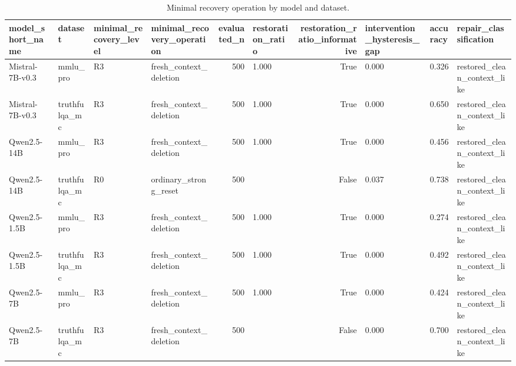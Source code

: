 \begin{table}
\caption{Minimal recovery operation by model and dataset.}
\label{tab:minimal_recovery_operation}
\begin{tabular}{llllrlrlll}
\toprule
model\_short\_name & dataset & minimal\_recovery\_level & minimal\_recovery\_operation & evaluated\_n & restoration\_ratio & restoration\_ratio\_informative & intervention\_hysteresis\_gap & accuracy & repair\_classification \\
\midrule
Mistral-7B-v0.3 & mmlu\_pro & R3 & fresh\_context\_deletion & 500 & 1.000 & True & 0.000 & 0.326 & restored\_clean\_context\_like \\
Mistral-7B-v0.3 & truthfulqa\_mc & R3 & fresh\_context\_deletion & 500 & 1.000 & True & 0.000 & 0.650 & restored\_clean\_context\_like \\
Qwen2.5-14B & mmlu\_pro & R3 & fresh\_context\_deletion & 500 & 1.000 & True & 0.000 & 0.456 & restored\_clean\_context\_like \\
Qwen2.5-14B & truthfulqa\_mc & R0 & ordinary\_strong\_reset & 500 &  & False & 0.037 & 0.738 & restored\_clean\_context\_like \\
Qwen2.5-1.5B & mmlu\_pro & R3 & fresh\_context\_deletion & 500 & 1.000 & True & 0.000 & 0.274 & restored\_clean\_context\_like \\
Qwen2.5-1.5B & truthfulqa\_mc & R3 & fresh\_context\_deletion & 500 & 1.000 & True & 0.000 & 0.492 & restored\_clean\_context\_like \\
Qwen2.5-7B & mmlu\_pro & R3 & fresh\_context\_deletion & 500 & 1.000 & True & 0.000 & 0.424 & restored\_clean\_context\_like \\
Qwen2.5-7B & truthfulqa\_mc & R3 & fresh\_context\_deletion & 500 &  & False & 0.000 & 0.700 & restored\_clean\_context\_like \\
\bottomrule
\end{tabular}
\end{table}
